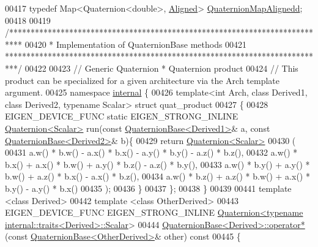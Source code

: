 \begin{DoxyCode}
00417 \textcolor{keyword}{typedef} Map<Quaternion<double>, \hyperlink{group__enums_gga45fe06e29902b7a2773de05ba27b47a1ad37d4c71425bb286e9b4103830538fbf}{Aligned}>  \hyperlink{group___geometry___module_ga4c11d0bbf7602645581380ba3cd6e690}{QuaternionMapAlignedd};
00418 
00419 \textcolor{comment}{/***************************************************************************}
00420 \textcolor{comment}{* Implementation of QuaternionBase methods}
00421 \textcolor{comment}{***************************************************************************/}
00422 
00423 \textcolor{comment}{// Generic Quaternion * Quaternion product}
00424 \textcolor{comment}{// This product can be specialized for a given architecture via the Arch template argument.}
00425 \textcolor{keyword}{namespace }\hyperlink{namespaceinternal}{internal} \{
00426 \textcolor{keyword}{template}<\textcolor{keywordtype}{int} Arch, \textcolor{keyword}{class} Derived1, \textcolor{keyword}{class} Derived2, \textcolor{keyword}{typename} Scalar> \textcolor{keyword}{struct }quat\_product
00427 \{
00428   EIGEN\_DEVICE\_FUNC \textcolor{keyword}{static} EIGEN\_STRONG\_INLINE \hyperlink{group___geometry___module_class_eigen_1_1_quaternion}{Quaternion<Scalar>} run(\textcolor{keyword}{const} 
      \hyperlink{group___geometry___module_class_eigen_1_1_quaternion_base}{QuaternionBase<Derived1>}& a, \textcolor{keyword}{const} 
      \hyperlink{group___geometry___module_class_eigen_1_1_quaternion_base}{QuaternionBase<Derived2>}& b)\{
00429     \textcolor{keywordflow}{return} \hyperlink{group___geometry___module_class_eigen_1_1_quaternion}{Quaternion<Scalar>}
00430     (
00431       a.w() * b.w() - a.x() * b.x() - a.y() * b.y() - a.z() * b.z(),
00432       a.w() * b.x() + a.x() * b.w() + a.y() * b.z() - a.z() * b.y(),
00433       a.w() * b.y() + a.y() * b.w() + a.z() * b.x() - a.x() * b.z(),
00434       a.w() * b.z() + a.z() * b.w() + a.x() * b.y() - a.y() * b.x()
00435     );
00436   \}
00437 \};
00438 \}
00439 
00441 \textcolor{keyword}{template} <\textcolor{keyword}{class} Derived>
00442 \textcolor{keyword}{template} <\textcolor{keyword}{class} OtherDerived>
00443 EIGEN\_DEVICE\_FUNC EIGEN\_STRONG\_INLINE 
      \hyperlink{group___geometry___module_class_eigen_1_1_quaternion}{Quaternion<typename internal::traits<Derived>::Scalar}>
00444 \hyperlink{group___geometry___module_class_eigen_1_1_quaternion_base}{QuaternionBase<Derived>::operator* }(\textcolor{keyword}{const} 
      \hyperlink{group___geometry___module_class_eigen_1_1_quaternion_base}{QuaternionBase<OtherDerived>}& other)\textcolor{keyword}{ const}
00445 \textcolor{keyword}{}\{

\end{DoxyCode}

